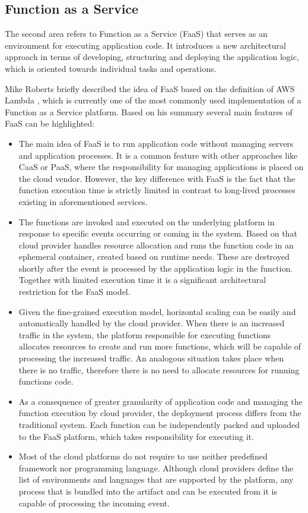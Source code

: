 \subsection{Function as a Service} \label{chapter:serverless-faas}

The second area refers to Function as a Service (FaaS) that serves as an environment for executing application code. It introduces a new architectural approach in terms of developing, structuring and deploying the application logic, which is oriented towards individual tasks and operations.

Mike Roberts briefly described the idea of FaaS \cite{MartinFowlerServerless} based on the definition of AWS Lambda \cite{AWSLambda}, which is currently one of the most commonly used implementation of a Function as a Service platform. Based on his summary several main features of FaaS can be highlighted:

\begin{itemize}
    \item The main idea of FaaS is to run application code without managing servers and application processes. It is a common feature with other approaches like CaaS or PaaS, where the responsibility for managing applications is placed on the cloud vendor. However, the key difference with FaaS is the fact that the function execution time is strictly limited in contrast to long-lived processes existing in aforementioned services.
    \item The functions are invoked and executed on the underlying platform in response to specific events occurring or coming in the system. Based on that cloud provider handles resource allocation and runs the function code in an ephemeral container, created based on runtime needs. These are destroyed shortly after the event is processed by the application logic in the function. Together with limited execution time it is a significant architectural restriction for the FaaS model.
    \item Given the fine-grained execution model, horizontal scaling can be easily and automatically handled by the cloud provider. When there is an increased traffic in the system, the platform responsible for executing functions allocates resources to create and run more functions, which will be capable of processing the increased traffic. An analogous situation takes place when there is no traffic, therefore there is no need to allocate resources for running functions code.
    \item As a consequence of greater granularity of application code and managing the function execution by cloud provider, the deployment process differs from the traditional system. Each function can be independently packed and uploaded to the FaaS platform, which takes responsibility for executing it.
    \item Most of the cloud platforms do not require to use neither predefined framework nor programming language. Although cloud providers define the list of environments and languages that are supported by the platform, any process that is bundled into the artifact and can be executed from it is capable of processing the incoming event.
\end{itemize}

